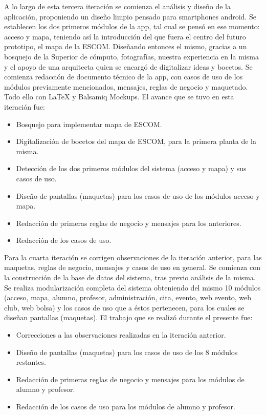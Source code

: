 \noindent
A lo largo de esta tercera iteración se comienza el análisis y diseño de la aplicación, proponiendo un diseño limpio pensado para smartphones android. Se establecen los dos primeros módulos de la app, tal cual se pensó en ese momento: acceso y mapa, teniendo así la introducción del que fuera el centro del futuro prototipo, el mapa de la ESCOM. Diseñando entonces el mismo, gracias a un bosquejo de la Superior de cómputo, fotografías, nuestra experiencia en la misma y el apoyo de una arquitecta quien se encargó de digitalizar ideas y bocetos. Se comienza redacción de documento técnico de la app, con casos de uso de los módulos previamente mencionados, mensajes, reglas de negocio y maquetado. Todo ello con LaTeX y Balsamiq Mockups. El avance que se tuvo en esta iteración fue: 
\begin{itemize}
	\item Bosquejo para implementar mapa de ESCOM.
	\item Digitalización de bocetos del mapa de ESCOM, para la primera planta de la misma.
	\item Detección de los dos primeros módulos del sistema (acceso y mapa) y sus casos de uso.
	\item Diseño de pantallas (maquetas) para los casos de uso de los módulos acceso y mapa.
	\item Redacción de primeras reglas de negocio y mensajes para los anteriores.
	\item Redacción de los casos de uso. 
\end{itemize}

\noindent
Para la cuarta iteración se corrigen observaciones de la iteración anterior, para las maquetas, reglas de negocio, mensajes y casos de uso en general. Se comienza con la construcción de la base de datos del sistema, tras previo análisis de la misma. Se realiza modularización completa del sistema obteniendo del mismo 10 módulos (acceso, mapa, alumno, profesor, administración, cita, evento, web evento, web club, web bolsa) y los casos de uso que a éstos pertenecen, para los cuales se diseñan pantallas (maquetas). El trabajo que se realizó durante el presente fue: 
\begin{itemize}
	\item Correcciones a las observaciones realizadas en la iteración anterior. 
	\item Diseño de pantallas (maquetas) para los casos de uso de los 8 módulos restantes.
	\item Redacción de primeras reglas de negocio y mensajes para los módulos de alumno y profesor.
	\item Redacción de los casos de uso para los módulos de alumno y profesor.
\end{itemize}

